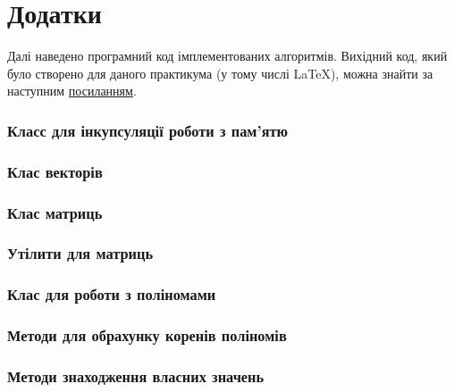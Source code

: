 \section*{\centering Додатки}



Далі наведено програмний код імплементованих алгоритмів.
Вихідний код, який було створено для даного практикума
(у тому числі \LaTeX),
можна знайти за наступним
\href{https://github.com/ShkalikovOleh/Programming-Labs}{посиланням}.

\subsubsection*{Класс для інкупсуляції роботи з пам'ятю}


\subsubsection*{Клас векторів}


\subsubsection*{Клас матриць}


\subsubsection*{Утілити для матриць}


\subsubsection*{Клас для роботи з поліномами}


\subsubsection*{Методи для обрахунку коренів поліномів}


\subsubsection*{Методи знаходження власних значень}

